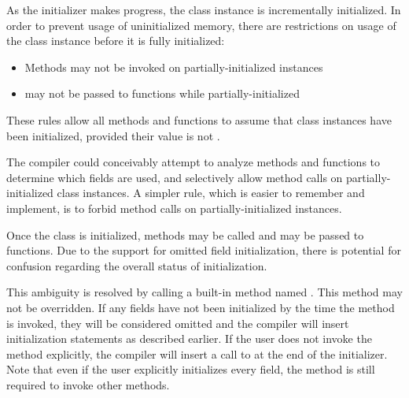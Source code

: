 As the initializer makes progress, the class instance is incrementally
initialized. In order to prevent usage of uninitialized memory, there are
restrictions on usage of the class instance before it is fully initialized:

\begin{itemize}
\item Methods may not be invoked on partially-initialized instances
\item {} may not be passed to functions while partially-initialized
\end{itemize}

These rules allow all methods and functions to assume that class instances
have been initialized, provided their value is not .

\begin{rationale}
  The compiler could conceivably attempt to analyze methods and functions to
  determine which fields are used, and selectively allow method calls on
  partially-initialized class instances. A simpler rule, which is easier to
  remember and implement, is to forbid method calls on partially-initialized
  instances.
\end{rationale}

Once the class is initialized, methods may be called and  may be
passed to functions. Due to the support for omitted field initialization, there
is potential for confusion regarding the overall status of initialization.

This ambiguity is resolved by calling a built-in method named .
This method may not be overridden. If any fields have not been initialized by
the time the  method is invoked, they will be considered omitted
and the compiler will insert initialization statements as described earlier. If
the user does not invoke the  method explicitly, the compiler
will insert a call to  at the end of the initializer. Note that
even if the user explicitly initializes every field, the  method
is still required to invoke other methods.

